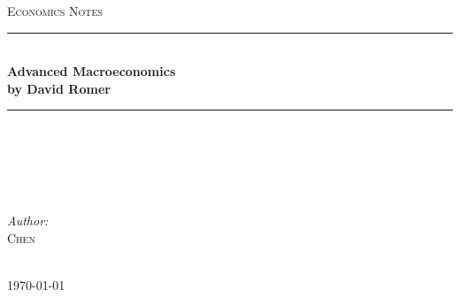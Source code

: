 \documentclass[12pt]{article} %
\begin{document}

\begin{titlepage}

\newcommand{\HRule}{\rule{\linewidth}{0.5mm}} %

\center %

\textsc{\LARGE Economics Notes}\\[2cm] %

\HRule \\[0.8cm]
{ \huge \bfseries Advanced Macroeconomics}\\[0.4cm] %
{ \large \bfseries by David Romer}\\[0.1cm]
\HRule \\[1.5cm]

\begin{minipage}{0.4\textwidth}
\begin{flushleft} \large
\emph{}\\
 \textsc{} %
\end{flushleft}
\end{minipage}
~
\begin{minipage}{0.4\textwidth}
\begin{flushright} \large
\emph{Author:} \\
\textsc{Chen} %
\end{flushright}
\end{minipage}\\[4cm]
\vfill
{\large \today}\\[2cm] %



\end{titlepage}

\end{document}
